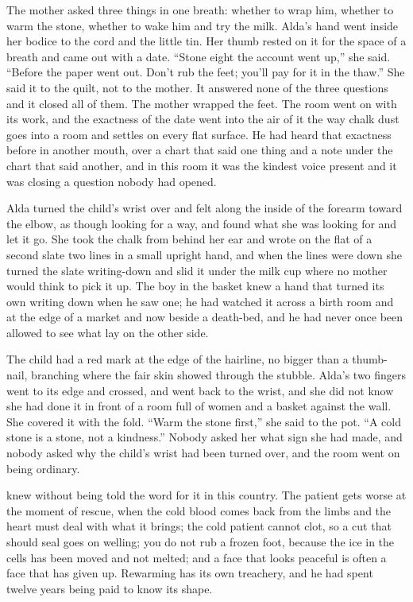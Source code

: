 The mother asked three things in one breath: whether to wrap him, whether to warm the stone, whether to wake him and try the milk. Alda's hand went inside her bodice to the cord and the little tin. Her thumb rested on it for the space of a breath and came out with a date. “Stone eight the account went up,” she said. “Before the paper went out. Don't rub the feet; you'll pay for it in the thaw.” She said it to the quilt, not to the mother. It answered none of the three questions and it closed all of them. The mother wrapped the feet. The room went on with its work, and the exactness of the date went into the air of it the way chalk dust goes into a room and settles on every flat surface. He had heard that exactness before in another mouth, over a chart that said one thing and a note under the chart that said another, and in this room it was the kindest voice present and it was closing a question nobody had opened.

Alda turned the child's wrist over and felt along the inside of the forearm toward the elbow, as though looking for a way, and found what she was looking for and let it go. She took the chalk from behind her ear and wrote on the flat of a second slate two lines in a small upright hand, and when the lines were down she turned the slate writing-down and slid it under the milk cup where no mother would think to pick it up. The boy in the basket knew a hand that turned its own writing down when he saw one; he had watched it across a birth room and at the edge of a market and now beside a death-bed, and he had never once been allowed to see what lay on the other side.

The child had a red mark at the edge of the hairline, no bigger than a thumb-nail, branching where the fair skin showed through the stubble. Alda's two fingers went to its edge and crossed, and went back to the wrist, and she did not know she had done it in front of a room full of women and a basket against the wall. She covered it with the fold. “Warm the stone first,” she said to the pot. “A cold stone is a stone, not a kindness.” Nobody asked her what sign she had made, and nobody asked why the child's wrist had been turned over, and the room went on being ordinary.

\scenebreak

 knew  without being told the word for it in this country. The patient gets worse at the moment of rescue, when the cold blood comes back from the limbs and the heart must deal with what it brings; the cold patient cannot clot, so a cut that should seal goes on welling; you do not rub a frozen foot, because the ice in the cells has been moved and not melted; and a face that looks peaceful is often a face that has given up. Rewarming has its own treachery, and he had spent twelve years being paid to know its shape.

